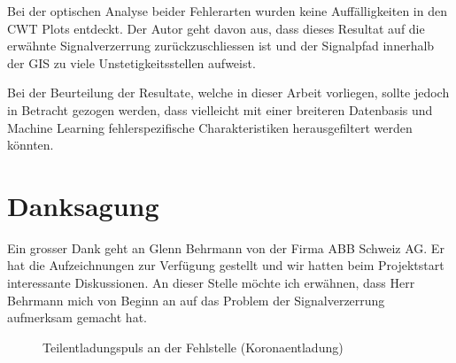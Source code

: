 \begin{refsection}
Bei der optischen Analyse beider Fehlerarten wurden keine Auffälligkeiten in den CWT Plots entdeckt. 
Der Autor geht davon aus, dass dieses Resultat auf die erwähnte Signalverzerrung zurückzuschliessen ist und der Signalpfad innerhalb der GIS zu viele Unstetigkeitsstellen aufweist.

Bei der Beurteilung der Resultate, welche in dieser Arbeit vorliegen, sollte jedoch in Betracht gezogen werden, dass vielleicht mit einer breiteren Datenbasis und Machine Learning fehlerspezifische Charakteristiken herausgefiltert werden könnten. 

\section{Danksagung}
Ein grosser Dank geht an Glenn Behrmann von der Firma ABB Schweiz AG. 
Er hat die Aufzeichnungen zur Verfügung gestellt und wir hatten beim Projektstart interessante Diskussionen. An dieser Stelle möchte ich erwähnen, dass Herr Behrmann mich von Beginn an auf das Problem der Signalverzerrung aufmerksam gemacht hat.

\begin{figure}
	\centering
    \caption{Teilentladungspuls an der Fehlstelle (Koronaentladung) \cite{skript:Judd24ps}}
	\label{fig:Teilentaldungspuls}
\end{figure}

\printbibliography[heading=subbibliography]
\end{refsection}
